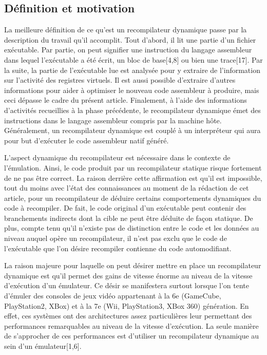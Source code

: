 \documentclass{article} %
\begin{document}
\subsection{Définition et motivation}
La meilleure définition de ce qu'est un recompilateur dynamique passe par la description du travail qu'il accomplit. Tout d'abord, il lit une partie d'un fichier exécutable. Par partie, on peut signifier une instruction du langage assembleur dans lequel l'exécutable a été écrit, un bloc de base[4,8] ou bien une trace[17]. Par la suite, la partie de l'exécutable lue est analysée pour y extraire de l'information sur l'activité des registres virtuels. Il est aussi possible d'extraire d'autres informations pour aider à optimiser le nouveau code assembleur à produire, mais ceci dépasse le cadre du présent article. Finalement, à l'aide des informations d'activités recueillies à la phase précédente, le recompilateur dynamique émet des instructions dans le langage assembleur compris par la machine hôte. Généralement, un recompilateur dynamique est couplé à un interpréteur qui aura pour but d'exécuter le code assembleur natif généré.

L'aspect dynamique du recompilateur est nécessaire dans le contexte de l'émulation. Ainsi, le code produit par un recompilateur statique risque fortement de ne pas être correct. La raison derrière cette affirmation est qu'il est impossible, tout du moins avec l'état des connaissances au moment de la rédaction de cet article, pour un recompilateur de déduire certains comportements dynamiques du code à recompiler. De fait, le code original d'un exécutable peut contenir des branchements indirects dont la cible ne peut être déduite de façon statique. De plus, compte tenu qu'il n'existe pas de distinction entre le code et les données au niveau auquel opère un recompilateur, il n'est pas exclu que le code de l'exécutable que l'on désire recompiler contienne du code automodifiant.

La raison majeure pour laquelle on peut désirer mettre en place un recompilateur dynamique est qu'il permet des gains de vitesse énorme au niveau de la vitesse d'exécution d'un émulateur. Ce désir se manifestera surtout lorsque l'on tente d'émuler des consoles de jeux vidéo appartenant à la 6e (GameCube, PlayStation2, XBox) et à la 7e (Wii, PlayStation3, XBox 360) génération. En effet, ces systèmes ont des architectures assez particulières leur permettant des performances remarquables au niveau de la vitesse d'exécution. La seule manière de s'approcher de ces performances est d'utiliser un recompilateur dynamique au sein d'un émulateur[1,6].
\end{document}

